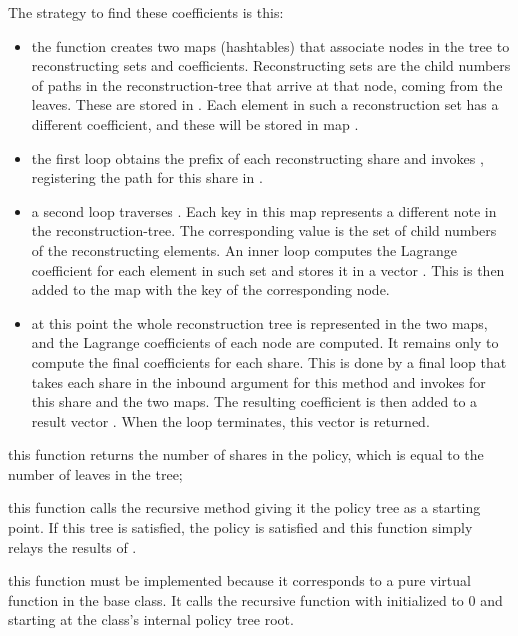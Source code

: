 \documentclass{article}
\begin{document}
\begin{description}
The strategy to find these coefficients is this:
\begin{itemize}
\item the function creates two maps (hashtables) that associate nodes in the tree to reconstructing sets and coefficients. Reconstructing sets are the child numbers of paths in the reconstruction-tree that arrive at that node, coming from the leaves. These are stored in . Each element in such a reconstruction set has a different coefficient, and these will be stored in map .
\item the first loop obtains the prefix of each reconstructing share and invokes , registering the path for this share in .
\item a second loop traverses . Each key in this map represents a different note in the reconstruction-tree. The corresponding value is the set of child numbers of the reconstructing elements. An inner loop computes the Lagrange coefficient for each element in such set and stores it in a vector . This is then added to the map  with the key of the corresponding node. 
\item at this point the whole reconstruction tree is represented in the two maps, and the Lagrange coefficients of each node are computed. It remains only to compute the final coefficients for each share. This is done by a final loop that takes each share in the inbound argument for this method and invokes  for this share and the two maps. The resulting coefficient is then added to a result vector . When the loop terminates, this vector is returned.
\end{itemize}


\item[\code{getNumShares()}] this function returns the number of shares in the policy, which is equal to the number of leaves in the tree;
\item[\code{evaluateIDs()}] this function calls the recursive method  giving it the policy tree as a starting point. If this tree is satisfied, the policy is satisfied and this function simply relays the results of .
\item[\code{obtainCoveredFrags()}] this function must be implemented because it corresponds to a pure virtual function in the base class. It calls the recursive function  with  initialized to $0$ and starting at the class's internal policy tree root.
\end{description}
\end{document}
